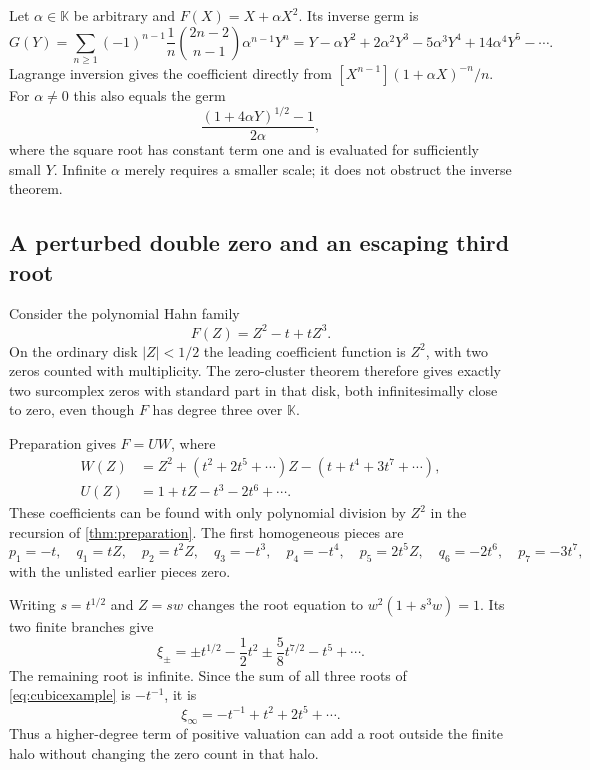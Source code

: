 \documentclass[11pt,letterpaper]{article}
\numberwithin{equation}{section}
\theoremstyle{definition}
\theoremstyle{remark}
\newcommand{\K}{\mathbb K}
\begin{document}
Let $\alpha\in\K$ be arbitrary and $F(X)=X+\alpha X^2$.
Its inverse germ is
\begin{equation}\label{eq:Catalanexample}
 G(Y)=\sum_{n\ge1}(-1)^{n-1}
       \frac1n\binom{2n-2}{n-1}\alpha^{n-1}Y^n
 =Y-\alpha Y^2+2\alpha^2Y^3-5\alpha^3Y^4+14\alpha^4Y^5-\cdots.
\end{equation}
Lagrange inversion gives the coefficient directly from
$[X^{n-1}](1+\alpha X)^{-n}/n$.
For $\alpha\ne0$ this also equals the germ
\[
 \frac{(1+4\alpha Y)^{1/2}-1}{2\alpha},
\]
where the square root has constant term one and is evaluated for
sufficiently small $Y$. Infinite $\alpha$ merely requires a smaller
scale; it does not obstruct the inverse theorem.

\subsection{A perturbed double zero and an escaping third root}

Consider the polynomial Hahn family
\begin{equation}\label{eq:cubicexample}
 F(Z)=Z^2-t+tZ^3.
\end{equation}
On the ordinary disk $|Z|<1/2$ the leading coefficient function is
$Z^2$, with two zeros counted with multiplicity. The zero-cluster theorem
therefore gives exactly two surcomplex zeros with standard part in that
disk, both infinitesimally close to zero, even though $F$ has degree three
over $\K$.

Preparation gives $F=UW$, where
\begin{align}
 W(Z)&=Z^2+(t^2+2t^5+\cdots)Z-(t+t^4+3t^7+\cdots),
       \label{eq:cubicW}\\
 U(Z)&=1+tZ-t^3-2t^6+\cdots.\label{eq:cubicU}
\end{align}
These coefficients can be found with only polynomial division by $Z^2$
in the recursion of \cref{thm:preparation}. The first homogeneous
pieces are
\[
 p_1=-t,\quad q_1=tZ,\quad p_2=t^2Z,\quad q_3=-t^3,
 \quad p_4=-t^4,\quad p_5=2t^5Z,\quad q_6=-2t^6,
 \quad p_7=-3t^7,
\]
with the unlisted earlier pieces zero.

Writing $s=t^{1/2}$ and $Z=sw$ changes the root equation to
$w^2(1+s^3w)=1$. Its two finite branches give
\begin{equation}\label{eq:cubicroots}
 \xi_\pm=\pm t^{1/2}-\frac12t^2
          \pm\frac58t^{7/2}-t^5+\cdots.
\end{equation}
The remaining root is infinite. Since the sum of all three roots of
\eqref{eq:cubicexample} is $-t^{-1}$, it is
\[
 \xi_\infty=-t^{-1}+t^2+2t^5+\cdots.
\]
Thus a higher-degree term of positive valuation can add a root outside
the finite halo without changing the zero count in that halo.
\end{document}
